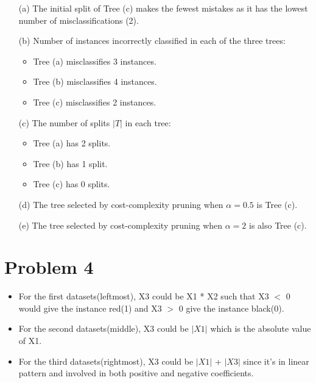 \documentclass{article}
\begin{document}
\begin{enumerate}
    \item[(a)] The initial split of Tree (c) makes the fewest mistakes as it has the lowest number of misclassifications (2).
    \item[(b)] Number of instances incorrectly classified in each of the three trees:
    \begin{itemize}
        \item Tree (a) misclassifies 3 instances.
        \item Tree (b) misclassifies 4 instances.
        \item Tree (c) misclassifies 2 instances.
    \end{itemize}
    \item[(c)] The number of splits \( |T| \) in each tree:
    \begin{itemize}
        \item Tree (a) has 2 splits.
        \item Tree (b) has 1 split.
        \item Tree (c) has 0 splits.
    \end{itemize}
    \item[(d)] The tree selected by cost-complexity pruning when \( \alpha = 0.5 \) is Tree (c).
    \item[(e)] The tree selected by cost-complexity pruning when \( \alpha = 2 \) is also Tree (c).
\end{enumerate}

\section*{Problem 4}
\begin{itemize}
    \item For the first datasets(leftmost), X3 could be X1 * X2 such that X3 $<$ 0 would give the instance red(1) and X3 $>$ 0 give the instance black(0).
    
    \item For the second datasets(middle), X3 could be $|X1|$ which is the absolute value of X1. 
    
    \item For the third datasets(rightmost), X3 could be $|X1|$ + $|X3|$ since it’s in linear pattern and involved in both positive and negative coefficients.
\end{itemize}
\end{document}
